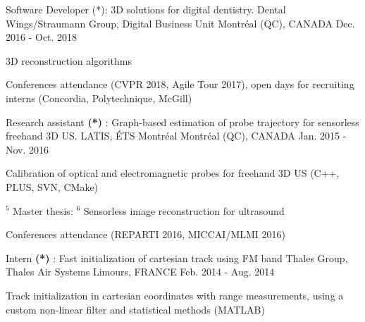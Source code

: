 \begin{cventries}

\cventry
{Software Developer (*): 3D solutions for digital dentistry.}%
{Dental Wings/Straumann Group, Digital Business Unit} %
{\hspace{-5mm}Montréal (QC), CANADA} %
{Dec. 2016 - Oct. 2018} %
{ %
\begin{cvitems}
\item {3D reconstruction algorithms}
\item {Conferences attendance (CVPR 2018, Agile Tour 2017), open days for recruiting interns (Concordia, Polytechnique, McGill)}
\end{cvitems}
}


\cventry
{Research assistant \textbf{(*)} : Graph-based estimation of probe trajectory for sensorless freehand 3D US.}%
{LATIS, ÉTS Montréal} %
{\hspace{-5mm}Montréal (QC), CANADA} %
{Jan. 2015 - Nov. 2016} %
{ %
\begin{cvitems}
\item {Calibration of optical and electromagnetic probes for freehand 3D US (C++, PLUS, SVN, CMake)}
\item {\hyperref[award:5]{$^5$} Master thesis: \hyperref[award:6]{$^6$} Sensorless image reconstruction for ultrasound}
\item {Conferences attendance (REPARTI 2016, MICCAI/MLMI 2016)}
\end{cvitems}
}


\cventry
{Intern \textbf{(*)} : Fast initialization of cartesian track using FM band} %
{Thales Group, Thales Air Systems} %
{Limours, FRANCE} %
{Feb. 2014 - Aug. 2014} %
{ %
\begin{cvitems}
\item {Track initialization in cartesian coordinates with range measurements, using a custom non-linear filter and statistical methods (MATLAB)}
\end{cvitems}
}
\end{cventries}
